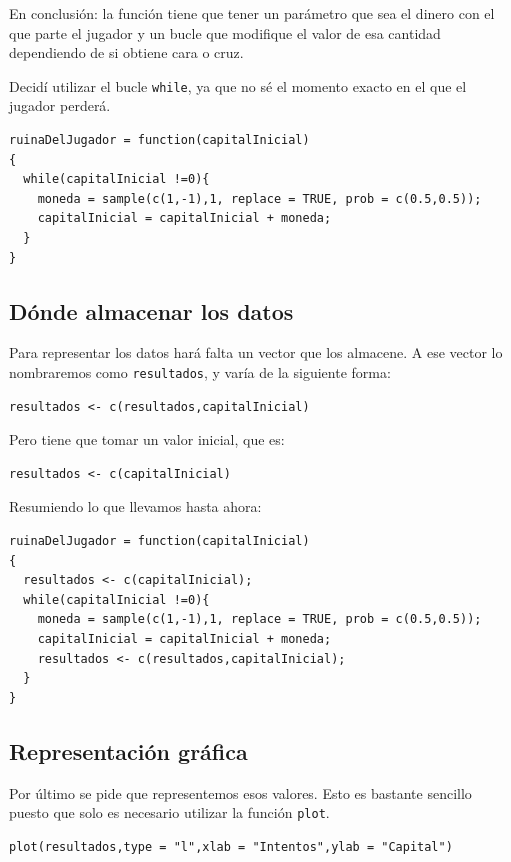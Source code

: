 \documentclass[10pt,a4paper]{article}
\begin{document}
En conclusión: la función tiene que tener un parámetro que sea el dinero con el que parte el jugador y un bucle que modifique el valor de esa cantidad dependiendo de si obtiene cara o cruz.

Decidí utilizar el bucle {\tt while}, ya que no sé el momento exacto en el que el jugador perderá.

\begin{verbatim}
ruinaDelJugador = function(capitalInicial)
{
  while(capitalInicial !=0){
    moneda = sample(c(1,-1),1, replace = TRUE, prob = c(0.5,0.5));
    capitalInicial = capitalInicial + moneda;
  }
}
\end{verbatim}

\subsection{Dónde almacenar los datos}
Para representar los datos hará falta un vector que los almacene. A ese vector lo nombraremos como {\tt resultados}, y varía de la siguiente forma:

\begin{verbatim}
resultados <- c(resultados,capitalInicial)
\end{verbatim}

Pero tiene que tomar un valor inicial, que es:

\begin{verbatim}
resultados <- c(capitalInicial)
\end{verbatim}

Resumiendo lo que llevamos hasta ahora:

\begin{verbatim}
ruinaDelJugador = function(capitalInicial)
{
  resultados <- c(capitalInicial);
  while(capitalInicial !=0){
    moneda = sample(c(1,-1),1, replace = TRUE, prob = c(0.5,0.5));
    capitalInicial = capitalInicial + moneda;
    resultados <- c(resultados,capitalInicial);
  }
}
\end{verbatim}

\subsection{Representación gráfica}
Por último se pide que representemos esos valores. Esto es bastante sencillo puesto que solo es necesario utilizar la función {\tt plot}.

\begin{verbatim}
plot(resultados,type = "l",xlab = "Intentos",ylab = "Capital")
\end{verbatim}
\end{document}
